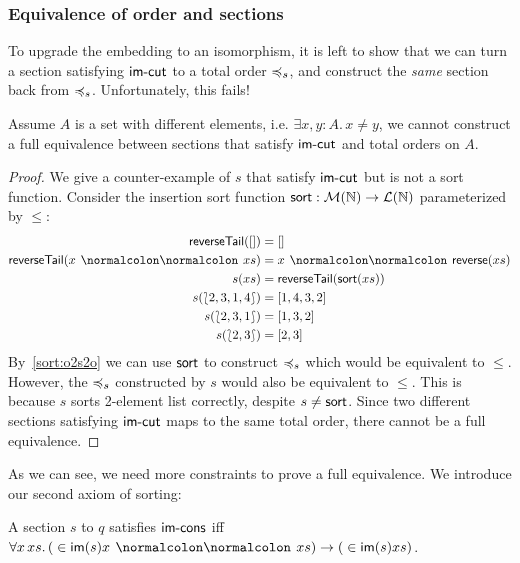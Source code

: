\subsubsection{Equivalence of order and sections}

To upgrade the embedding to an isomorphism, it is left
to show that we can turn a section satisfying $\operatorname{\mathsf{im-cut}}$ to a total order $\preccurlyeq_{s}$,
and construct the \emph{same} section back from $\preccurlyeq_{s}$. Unfortunately, this fails!

\begin{proposition}
    Assume $A$ is a set with different elements, i.e. $\exists x, y: A.\,x \neq y$,
    we cannot construct a full equivalence between sections that satisfy $\operatorname{\mathsf{im-cut}}$
    and total orders on $A$.
\end{proposition}

\begin{proof}
    We give a counter-example of $s$ that satisfy $\operatorname{\mathsf{im-cut}}$ but is not a sort function.
    Consider the insertion sort function $\operatorname{\mathsf{sort}} : \mathcal{M}(\mathbb{N}) \to \mathcal{L}(\mathbb{N})$
    parameterized by $\leq$:
    \begin{align*}
        \term{reverseTail}([])         & = []                                  \\
        \term{reverseTail}(x \cons xs) & = x \cons \term{reverse}(xs)          \\
        s(xs)                          & = \term{reverseTail}(\term{sort}(xs)) \\
        s(\bag{2,3,1,4})               & = [1,4,3,2]                           \\
        s(\bag{2,3,1})                 & = [1, 3, 2]                           \\
        s(\bag{2,3})                   & = [2, 3]                              \\
    \end{align*}
    By~\cref{sort:o2s2o} we can use $\operatorname{\mathsf{sort}}$ to construct $\preccurlyeq_{s}$ which would be
    equivalent to $\leq$. However, the $\preccurlyeq_{s}$ constructed by $s$ would also be equivalent
    to $\leq$. This is because $s$ sorts 2-element list correctly, despite $s \neq \operatorname{\mathsf{sort}}$.
    Since two different sections satisfying $\operatorname{\mathsf{im-cut}}$ maps to the same total order,
    there cannot be a full equivalence.
\end{proof}

As we can see, we need more constraints to prove a full equivalence.
We introduce our second axiom of sorting:
\begin{definition}[$\istailsort$]
    \label{def:tail-sort}
    A section $s$ to $q$ satisfies $\istailsort$ iff
    $\forall x\,xs.\,\issorted(x \cons xs) \to \issorted(xs)$.
\end{definition}

